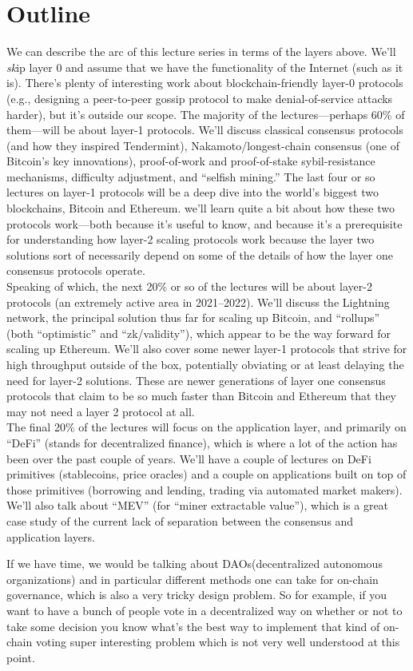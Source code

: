 \section{Outline}
 We can describe the arc of this lecture series in terms of the layers above. We’ll \textit{sk}ip layer 0
and assume that we have the functionality of the Internet (such as it is). There’s plenty of
interesting work about blockchain-friendly layer-0 protocols (e.g., designing a peer-to-peer
gossip protocol to make denial-of-service attacks harder), but it’s outside our scope.
The majority of the lectures—perhaps 60\% of them—will be about layer-1 protocols. We’ll discuss classical
consensus protocols (and how they inspired Tendermint), Nakamoto/longest-chain consensus
(one of Bitcoin’s key innovations), proof-of-work and proof-of-stake sybil-resistance mechanisms, difficulty adjustment, and “selfish mining.” The last four or so lectures on layer-1
protocols will be a deep dive into the world’s biggest two blockchains, Bitcoin and Ethereum. 
we’ll learn quite a
bit about how these two protocols work—both because it’s useful to know, and because it’s
a prerequisite for understanding how layer-2 scaling protocols work because the layer two
solutions sort of necessarily depend on
some of the details of how the layer one
consensus protocols operate.\\
Speaking of which, the next 20\% or so of the lectures will be about layer-2 protocols
(an extremely active area in 2021–2022). We’ll discuss the Lightning network, the principal
solution thus far for scaling up Bitcoin, and “rollups” (both “optimistic” and “zk/validity”),
    which appear to be the way forward for scaling up Ethereum. We’ll also
cover some newer layer-1 protocols that strive for high throughput outside of the box, potentially
obviating or at least delaying the need for layer-2 solutions. These are newer
generations of layer one consensus
protocols that claim to be so much
faster than Bitcoin and Ethereum that
they may not need a layer 2
protocol at all.\\
The final 20\% of the lectures will focus on the application layer, and primarily on “DeFi”
(stands for decentralized finance), which is where a lot of the action has been over the past couple
of years. We’ll have a couple of lectures on DeFi primitives (stablecoins, price oracles) and a
couple on applications built on top of those primitives (borrowing and lending, trading via
automated market makers). We’ll also talk about “MEV” (for “miner extractable value”),
which is a great case study of the current lack of separation between the consensus and
application layers.\par
If we have time, we would be talking about
DAOs(decentralized autonomous
organizations)
and in particular different methods one
can take for on-chain governance, which is
also a very tricky design problem. So for
example, if you want to have a bunch of
people vote in a decentralized way on
whether or not to take some decision you
know what's the best way to implement
that kind of on-chain voting super
interesting problem which is not 
very well understood at this point.\\


